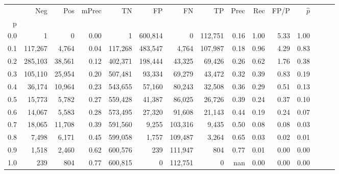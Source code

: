 \begin{tabular}{rrrrrrrrrrrrrrr}
\toprule
{} &      Neg &     Pos & mPrec &       TN &       FP &       FN &       TP &  Prec &   Rec &  FP/P & $\hat{p}$ \\
p   &          &         &       &          &          &          &          &       &       &       &           \\
\midrule
0.0 &        1 &       0 &  0.00 &        1 &  600,814 &        0 &  112,751 &  0.16 &  1.00 &  5.33 &      1.00 \\
0.1 &  117,267 &   4,764 &  0.04 &  117,268 &  483,547 &    4,764 &  107,987 &  0.18 &  0.96 &  4.29 &      0.83 \\
0.2 &  285,103 &  38,561 &  0.12 &  402,371 &  198,444 &   43,325 &   69,426 &  0.26 &  0.62 &  1.76 &      0.38 \\
0.3 &  105,110 &  25,954 &  0.20 &  507,481 &   93,334 &   69,279 &   43,472 &  0.32 &  0.39 &  0.83 &      0.19 \\
0.4 &   36,174 &  10,964 &  0.23 &  543,655 &   57,160 &   80,243 &   32,508 &  0.36 &  0.29 &  0.51 &      0.13 \\
0.5 &   15,773 &   5,782 &  0.27 &  559,428 &   41,387 &   86,025 &   26,726 &  0.39 &  0.24 &  0.37 &      0.10 \\
0.6 &   14,067 &   5,583 &  0.28 &  573,495 &   27,320 &   91,608 &   21,143 &  0.44 &  0.19 &  0.24 &      0.07 \\
0.7 &   18,065 &  11,708 &  0.39 &  591,560 &    9,255 &  103,316 &    9,435 &  0.50 &  0.08 &  0.08 &      0.03 \\
0.8 &    7,498 &   6,171 &  0.45 &  599,058 &    1,757 &  109,487 &    3,264 &  0.65 &  0.03 &  0.02 &      0.01 \\
0.9 &    1,518 &   2,460 &  0.62 &  600,576 &      239 &  111,947 &      804 &  0.77 &  0.01 &  0.00 &      0.00 \\
1.0 &      239 &     804 &  0.77 &  600,815 &        0 &  112,751 &        0 &   nan &  0.00 &  0.00 &      0.00 \\
\bottomrule
\end{tabular}
